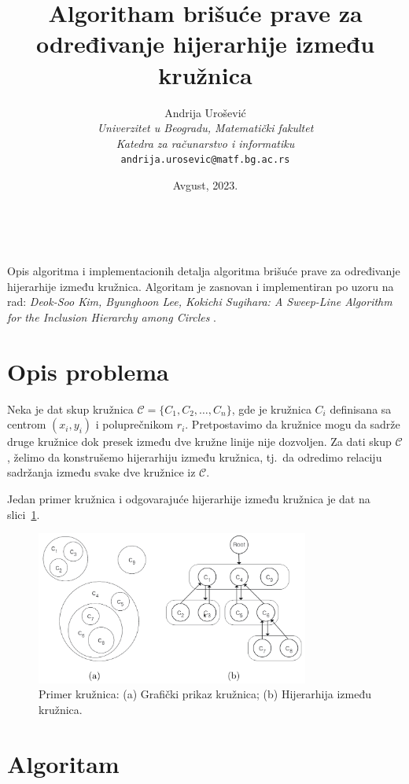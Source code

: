 \documentclass[a4paper,12pt]{article}
\title{Algoritham brišuće prave za određivanje hijerarhije između kružnica}
\author{Andrija Urošević\\\textit{Univerzitet u Beogradu, Matematički fakultet}\\\textit{Katedra za računarstvo i informatiku}\\\texttt{andrija.urosevic@matf.bg.ac.rs}}
\date{Avgust, 2023.}
\begin{document}
\maketitle\

Opis algoritma i implementacionih detalja algoritma brišuće prave za određivanje hijerarhije između kružnica. Algoritam je zasnovan i implementiran po uzoru na rad: \emph{Deok-Soo Kim, Byunghoon Lee, Kokichi Sugihara: A Sweep-Line Algorithm for the Inclusion Hierarchy among Circles} \cite{kls06}.

\section{Opis problema}

Neka je dat skup kružnica $\mathcal{C} = \{C_1, C_2, \ldots, C_n\}$, gde je kružnica $C_i$ definisana sa centrom $(x_i, y_i)$ i poluprečnikom $r_i$. Pretpostavimo da kružnice mogu da sadrže druge kružnice dok presek između dve kružne linije nije dozvoljen. Za dati skup $\mathcal{C}$, želimo da konstrušemo hijerarhiju između kružnica, tj.\ da odredimo relaciju sadržanja između svake dve kružnice iz $\mathcal{C}$. 

Jedan primer kružnica i odgovarajuće hijerarhije između kružnica je dat na slici~\ref{fig:example}.

\begin{figure}
\begin{center}
    \includegraphics[width=0.8\textwidth]{imgs/inc.png}
\end{center}
    \caption{Primer kružnica: (a) Grafički prikaz kružnica; (b) Hijerarhija između kružnica.}
\label{fig:example}
\end{figure}


\section{Algoritam}
\end{document}
